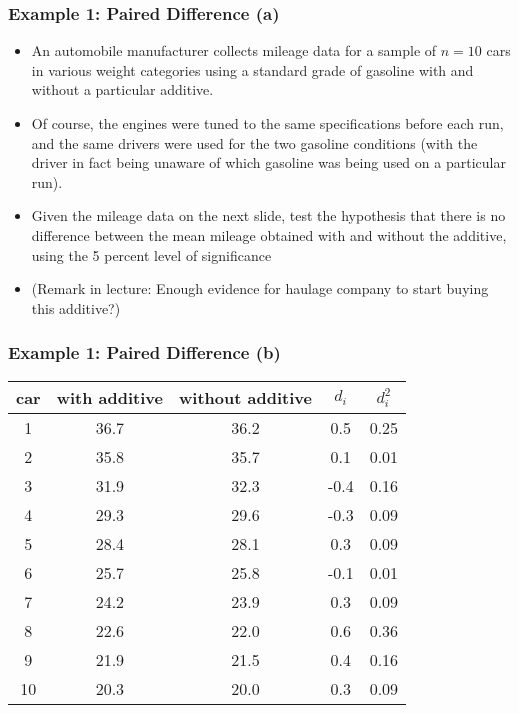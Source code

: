 \documentclass[a4]{beamer}
\begin{document}
\begin{frame}
\frametitle{Example 1: Paired Difference (a)}
\begin{itemize}
\item An automobile manufacturer collects mileage data for a sample of $n = 10$ cars in various weight categories
using a standard grade of gasoline with and without a particular additive. \item Of course, the engines were tuned to the same
specifications before each run, and the same drivers were used for the two gasoline conditions (with the driver in fact being
unaware of which gasoline was being used on a particular run). \item Given the mileage data on the next slide,  test the hypothesis
that there is no difference between the mean mileage obtained with and without the additive, using the 5 percent level of
significance \item (Remark in lecture: Enough evidence for haulage company to start buying this additive?) \end{itemize}
\end{frame}
\begin{frame}
\frametitle{Example 1: Paired Difference (b)}
\small
\begin{center}
\begin{tabular}{|c|c|c|c|c|}\hline
car & with additive & without additive & $d_i$ & $d^2_i$\\\hline
1&36.7&36.2&0.5&0.25\\\hline
2&35.8&35.7&0.1&0.01\\\hline
3&31.9&32.3&-0.4&0.16\\\hline
4&29.3&29.6&-0.3&0.09\\\hline
5&28.4&28.1&0.3&0.09\\\hline
6&25.7&25.8&-0.1&0.01\\\hline
7&24.2&23.9&0.3&0.09\\\hline
8&22.6&22.0&0.6&0.36\\\hline
9&21.9&21.5&0.4&0.16\\\hline
10&20.3&20.0&0.3&0.09\\\hline
\end{tabular}
\end{center}
\end{frame}
\end{document}
